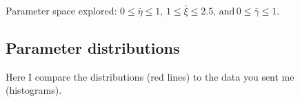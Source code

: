\documentclass{article}[12 pt]
\begin{document}
Parameter space explored: $0 \leq \bar \eta \leq 1, \, 1 \leq \bar \xi \leq 2.5, \, \text{and} \, 0 \leq \bar \gamma \leq 1$.

\subsection{Parameter distributions}
Here I compare the distributions (red lines) to the data you sent me (histograms).




\end{document}
